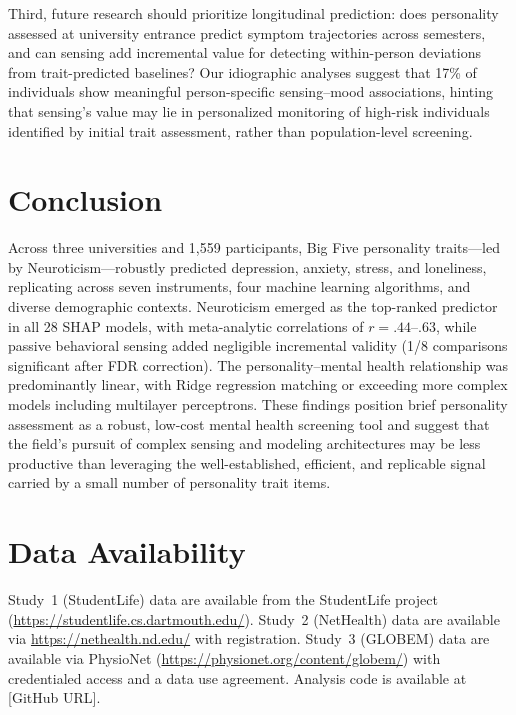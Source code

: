 \documentclass[12pt, a4paper]{article}
\begin{document}
Third, future research should prioritize longitudinal prediction: does personality assessed at university entrance predict symptom trajectories across semesters, and can sensing add incremental value for detecting within-person deviations from trait-predicted baselines? Our idiographic analyses suggest that 17\% of individuals show meaningful person-specific sensing--mood associations, hinting that sensing's value may lie in personalized monitoring of high-risk individuals identified by initial trait assessment, rather than population-level screening.

\section{Conclusion}

Across three universities and 1,559 participants, Big Five personality traits---led by Neuroticism---robustly predicted depression, anxiety, stress, and loneliness, replicating across seven instruments, four machine learning algorithms, and diverse demographic contexts. Neuroticism emerged as the top-ranked predictor in all 28 SHAP models, with meta-analytic correlations of $r = .44$--.63, while passive behavioral sensing added negligible incremental validity (1/8 comparisons significant after FDR correction). The personality--mental health relationship was predominantly linear, with Ridge regression matching or exceeding more complex models including multilayer perceptrons. These findings position brief personality assessment as a robust, low-cost mental health screening tool and suggest that the field's pursuit of complex sensing and modeling architectures may be less productive than leveraging the well-established, efficient, and replicable signal carried by a small number of personality trait items.


\section*{Data Availability}

Study~1 (StudentLife) data are available from the StudentLife project (\url{https://studentlife.cs.dartmouth.edu/}). Study~2 (NetHealth) data are available via \url{https://nethealth.nd.edu/} with registration. Study~3 (GLOBEM) data are available via PhysioNet (\url{https://physionet.org/content/globem/}) with credentialed access and a data use agreement. Analysis code is available at [GitHub URL].
\end{document}
